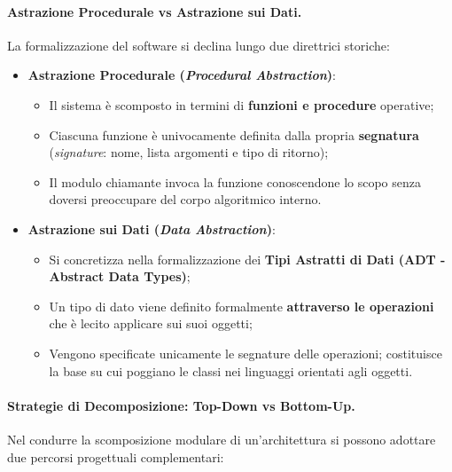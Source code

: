 \documentclass[12pt]{extarticle}
\begin{document}
\paragraph{Astrazione Procedurale vs Astrazione sui Dati.}
La formalizzazione del software si declina lungo due direttrici storiche:
\begin{itemize}
    \item \textbf{Astrazione Procedurale (\textit{Procedural Abstraction})}:
    \begin{itemize}
        \item Il sistema è scomposto in termini di \textbf{funzioni e procedure} operative;
        \item Ciascuna funzione è univocamente definita dalla propria \textbf{segnatura} (\textit{signature}: nome, lista argomenti e tipo di ritorno);
        \item Il modulo chiamante invoca la funzione conoscendone lo scopo senza doversi preoccupare del corpo algoritmico interno.
    \end{itemize}
    \item \textbf{Astrazione sui Dati (\textit{Data Abstraction})}:
    \begin{itemize}
        \item Si concretizza nella formalizzazione dei \textbf{Tipi Astratti di Dati (ADT - Abstract Data Types)};
        \item Un tipo di dato viene definito formalmente \textbf{attraverso le operazioni} che è lecito applicare sui suoi oggetti;
        \item Vengono specificate unicamente le segnature delle operazioni; costituisce la base su cui poggiano le classi nei linguaggi orientati agli oggetti.
    \end{itemize}
\end{itemize}

\paragraph{Strategie di Decomposizione: Top-Down vs Bottom-Up.}
Nel condurre la scomposizione modulare di un'architettura si possono adottare due percorsi progettuali complementari:
\end{document}

